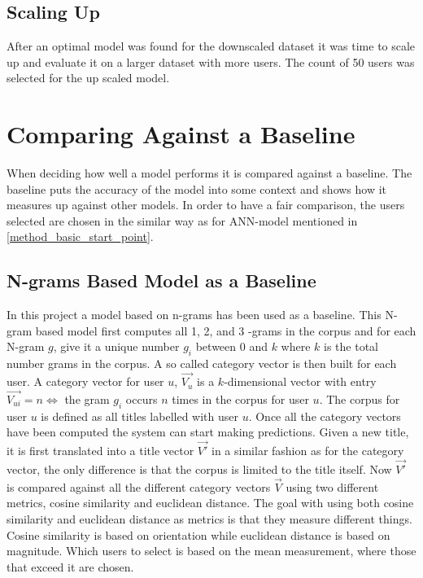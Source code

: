 \subsection{Scaling Up}
After an optimal model was found for the downscaled dataset it was time to scale up and evaluate it on a larger dataset with more users. The count of 50 users was selected for the up scaled model. 
\section{Comparing Against a Baseline}
When deciding how well a model performs it is compared against a baseline. The baseline puts the accuracy of the model into some context and shows how it measures up against other models. In order to have a fair comparison, the users selected are chosen in the similar way as for ANN-model mentioned in \ref{method_basic_start_point}. 

\subsection{N-grams Based Model as a Baseline}
In this project a model based on n-grams \parencite{cavnar1994n} has been used as a baseline. This N-gram based model first computes all 1, 2, and 3 -grams in the corpus and for each N-gram $g$, give it a unique number $g_i$ between $0$ and $k$ where $k$ is the total number grams in the corpus. A so called category vector is then built for each user. A category vector for user $u$, $\vec{V_u}$ is a $k$-dimensional vector with entry $\vec{V_{ui}} = n \iff $ the gram $g_i$ occurs $n$ times in the corpus for user $u$. The corpus for user $u$ is defined as all titles labelled with user $u$. Once all the category vectors have been computed the system can start making predictions. Given a new title, it is first translated into a title vector $\vec{V'}$ in a similar fashion as for the category vector, the only difference is that the corpus is limited to the title itself. Now $\vec{V'}$ is compared against all the different category vectors $\vec{V}$ using two different metrics, cosine similarity \parencite{steinbach2000comparison} and euclidean distance. The goal with using both cosine similarity and euclidean distance as metrics is that they measure different things. Cosine similarity is based on orientation while euclidean distance is based on magnitude. Which users to select is based on the mean measurement, where those that exceed it are chosen. 

